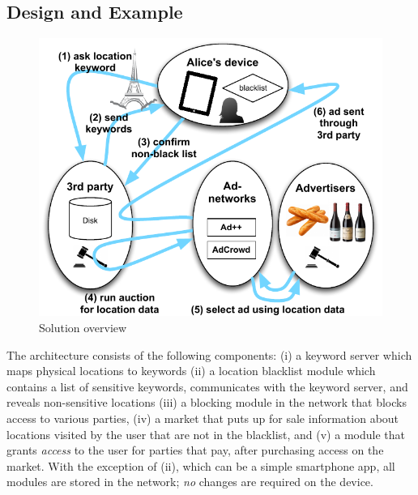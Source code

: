 

\subsection{Design and Example}
\label{subsec:design}

\begin{figure}[t]
	\begin{center}
		\includegraphics[width=0.9\linewidth]{fig/keyword/TLPOverview.pdf}
	\end{center}
	\caption{Solution overview}
	\label{fig:overview}
\end{figure}
The architecture consists of the following components: 
(i) a keyword server which maps physical locations to keywords
(ii) a location blacklist module which contains a list of sensitive keywords, 
communicates with the keyword server, and reveals non-sensitive locations
(iii) a blocking module in the network that blocks access to various parties, 
(iv) a market that puts up for sale information about locations visited by the user that are not in the blacklist, 
and (v) a module that grants \emph{access}
to the user for parties that pay, after purchasing access on the market.
With the exception of (ii), which can be a simple smartphone app, all modules are stored in the network; \emph{no} changes are required on the device.

